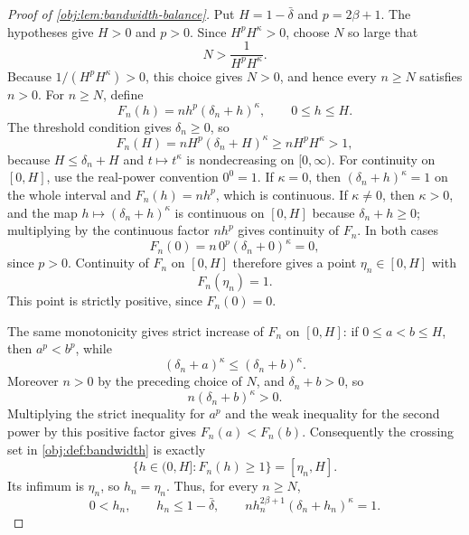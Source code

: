 \begin{proof}[Proof of \cref{obj:lem:bandwidth-balance}]
Put \(H=1-\bar\delta\) and \(p=2\beta+1\).  The hypotheses give \(H>0\) and \(p>0\).  Since \(H^pH^\kappa>0\), choose \(N\) so large that
\[
        N>\frac{1}{H^pH^\kappa}.
\]
Because \(1/(H^pH^\kappa)>0\), this choice gives \(N>0\), and hence every \(n\ge N\) satisfies \(n>0\).  For \(n\ge N\), define
\[
        F_n(h)=n h^p(\delta_n+h)^\kappa,\qquad 0\le h\le H .
\]
The threshold condition gives \(\delta_n\ge0\), so
\[
        F_n(H)
        = nH^p(\delta_n+H)^\kappa
        \ge nH^pH^\kappa
        >1,
\]
because \(H\le \delta_n+H\) and \(t\mapsto t^\kappa\) is nondecreasing on \([0,\infty)\).  For continuity on \([0,H]\), use the real-power convention \(0^0=1\).  If \(\kappa=0\), then \((\delta_n+h)^\kappa=1\) on the whole interval and \(F_n(h)=n h^p\), which is continuous.  If \(\kappa\ne0\), then \(\kappa>0\), and the map \(h\mapsto(\delta_n+h)^\kappa\) is continuous on \([0,H]\) because \(\delta_n+h\ge0\); multiplying by the continuous factor \(n h^p\) gives continuity of \(F_n\).  In both cases
\[
        F_n(0)=n\,0^p(\delta_n+0)^\kappa=0,
\]
since \(p>0\).  Continuity of \(F_n\) on \([0,H]\) therefore gives a point \(\eta_n\in[0,H]\) with
\[
        F_n(\eta_n)=1.
\]
This point is strictly positive, since \(F_n(0)=0\). %

The same monotonicity gives strict increase of \(F_n\) on \([0,H]\): if \(0\le a<b\le H\), then \(a^p<b^p\), while
\[
        (\delta_n+a)^\kappa\le(\delta_n+b)^\kappa .
\]
Moreover \(n>0\) by the preceding choice of \(N\), and \(\delta_n+b>0\), so
\[
        n(\delta_n+b)^\kappa>0 .
\]
Multiplying the strict inequality for \(a^p\) and the weak inequality for the second power by this positive factor gives \(F_n(a)<F_n(b)\).  Consequently the crossing set in \cref{obj:def:bandwidth} is exactly
\[
        \{h\in(0,H]:F_n(h)\ge1\}=[\eta_n,H].
\]
Its infimum is \(\eta_n\), so \(h_n=\eta_n\).  Thus, for every \(n\ge N\),
\[
        0<h_n,\qquad h_n\le 1-\bar\delta,\qquad
        n h_n^{2\beta+1}(\delta_n+h_n)^\kappa=1 .
\]
\end{proof}
